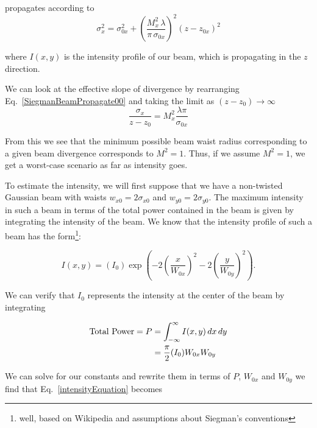 propagates according to 
\begin{equation}
\sigma_x^2=\sigma_{0x}^2+\left( \frac{M_x^2 \,\lambda}{\pi \, \sigma_{0x}}\right)^2 (z-z_{0x})^2 \label{SiegmanBeamPropagate00}
\end{equation}
 
where $I(x,y)$ is the intensity profile of our beam, which is propagating in the $z$ direction. 

We can look at the effective slope of divergence by rearranging Eq.\ \ref{SiegmanBeamPropagate00} and taking the limit as $(z-z_0) \rightarrow \infty$
\begin{equation}
\frac{\sigma_x}{z-z_0}=M_x^2 \frac{\lambda \pi}{\sigma_{0x}} \label{SiegmanBeamSlope}
\end{equation}

From this we see that the minimum possible beam waist radius corresponding to a given beam divergence corresponds to $M^2=1$. Thus, if we assume $M^2=1$, we get a worst-case scenario as far as intensity goes. 

To estimate the intensity, we will first suppose that we have a non-twisted Gaussian beam with waists $w_{x0}=2 \sigma_{x0}$ and $w_{y0}=2 \sigma_{y0}$. The maximum intensity in such a beam in terms of the total power contained in the beam is given by integrating the intensity of the beam. We know that the intensity profile of such a beam has the form\footnote{well, based on Wikipedia and assumptions about Siegman's conventions}:

\begin{equation}
I(x,y)=(I_0) \exp \left( -2 \left(\frac{x}{W_{0x}} \right)^2-2 \left( \frac{y}{W_{0y}}\right)^2\right). \label{intensityEquation}
\end{equation}

We can verify that $I_0$ represents the intensity at the center of the beam  by integrating%

\begin{align}
{\rm Total\ Power}=P&=\int_{-\infty}^\infty I(x,y)\, dx\, dy\\
&=\frac{\pi}{2}(I_0) W_{0x} W_{0y}
\end{align}

We can solve for our constants and rewrite them in terms of $P$, $W_{0x}$ and $W_{0y}$ we find that Eq.\ \ref{intensityEquation} becomes 

